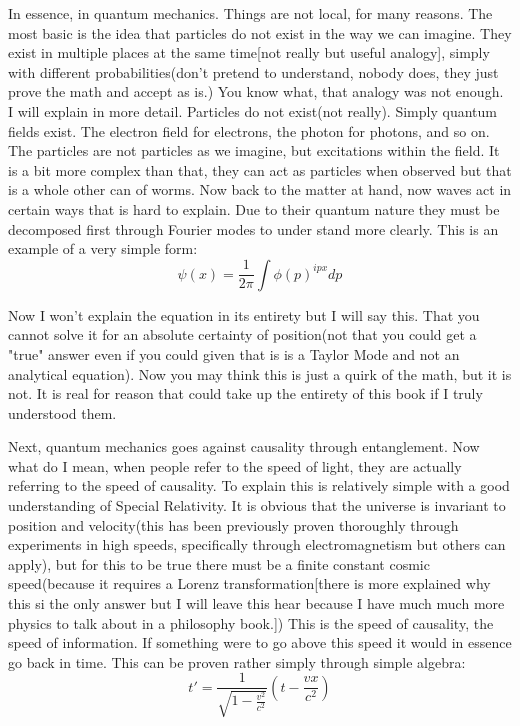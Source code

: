 \par In essence, in quantum mechanics. Things are not local, for many reasons. The most basic is the idea that particles do not exist in the way we can imagine. They exist in multiple places at the same time[not really but useful analogy], simply with different probabilities(don't pretend to understand, nobody does, they just prove the math and accept as is.) You know what, that analogy was not enough. I will explain in more detail. Particles do not exist(not really). Simply quantum fields exist. The electron field for electrons, the photon for photons, and so on. The particles are not particles as we imagine, but excitations within the field. It is a bit more complex than that, they can act as particles when observed but that is a whole other can of worms. Now back to the matter at hand, now waves act in certain ways that is hard to explain. Due to their quantum nature they must be decomposed first through Fourier modes to under stand more clearly. This is an example of a very simple form:
$$
\psi(x) = \frac{1}{2\pi} \int \phi(p)^{ipx}dp
$$
\par Now I won't explain the equation in its entirety but I will say this. That you cannot solve it for an absolute certainty of position(not that you could get a "true" answer even if you could given that is is a Taylor Mode and not an analytical equation). Now you may think this is just a quirk of the math, but it is not. It is real for reason that could take up the entirety of this book if I truly understood them.
\par Next, quantum mechanics goes against causality through entanglement. Now what do I mean, when people refer to the speed of light, they are actually referring to the speed of causality. To explain this is relatively simple with a good understanding of Special Relativity. It is obvious that the universe is invariant to position and velocity(this has been previously proven thoroughly through experiments in high speeds, specifically through electromagnetism but others can apply), but for this to be true there must be a finite constant cosmic speed(because it requires a Lorenz transformation[there is more explained why this si the only answer but I will leave this hear because I have much much more physics to talk about in a philosophy book.])  This is the speed of causality, the speed of information. If something were to go above this speed it would in essence go back in time. This can be proven rather simply through simple algebra:
$$t'=\frac{1}{\sqrt{1-\frac{v^2}{c^2}}}(t-\frac{vx}{c^2})
$$
